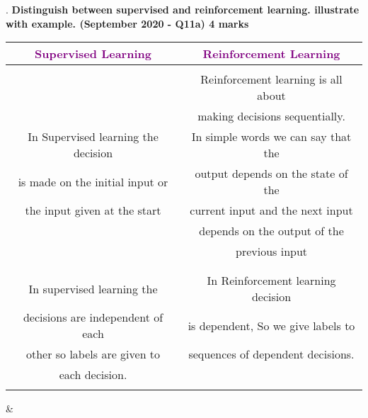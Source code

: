 .
\textbf{\textcolor{LightMagenta}{Distinguish between supervised and reinforcement learning. illustrate with example. (September 2020 - Q11a) \hfill 4 marks}} \\[5pt]


 \begin{tabular}{| c | c |} 
 \hline
 \textcolor{purple}{\textbf{Supervised Learning}} & \textcolor{purple}{\textbf{Reinforcement Learning}}  \\ [0.5ex] 
 \hline
                                     &                                      \\
                                     &  Reinforcement learning is all about \\
                                     &  making decisions sequentially. \\ 
 In Supervised learning the decision &  In simple words we can say that the \\
is made on the initial input or      &  output depends on the state of the \\
the input given at the start         &  current input and the next input \\
                                     &  depends on the output of the  \\
                                     &  previous input \\
                                     &                                      \\
 \hline
                                     &   \\
 In supervised learning the          & In Reinforcement learning decision \\
 decisions are independent of each   & is dependent, So we give labels to \\
 other so labels are given to        & sequences of dependent decisions.  \\
 each decision.                      & \\
                                     & \\
 \hline
 \end{tabular}
                                     &      \\
